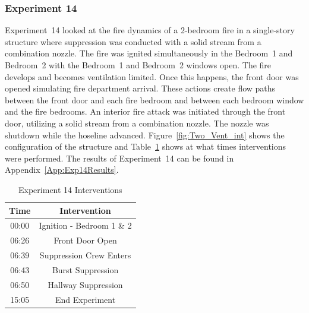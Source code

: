 \documentclass[12pt,oneside]{book}
\begin{document}
\subsubsection{Experiment 14}
Experiment~14 looked at the fire dynamics of a 2-bedroom fire in a single-story structure where suppression was conducted with a solid stream from a combination nozzle. The fire was ignited simultaneously in the Bedroom~1 and Bedroom~2 with the Bedroom~1 and Bedroom~2 windows open. The fire develops and becomes ventilation limited. Once this happens, the front door was opened simulating fire department arrival. These actions create flow paths between the front door and each fire bedroom and between each bedroom window and the fire bedrooms. An interior fire attack was initiated through the front door, utilizing a solid stream from a combination nozzle. The nozzle was shutdown while the hoseline advanced. Figure~\ref{fig:Two_Vent_int} shows the configuration of the structure and Table~\ref{Table:Exp14Interventions} shows at what times interventions were performed. The results of Experiment~14 can be found in Appendix~\ref{App:Exp14Results}. 


\begin{table}[H]
	\centering
	\caption{Experiment 14 Interventions}
	\begin{tabular}{|c|c|} 
		\hline
		Time & Intervention \\ \hline \hline
		00:00 & Ignition - Bedroom 1 \& 2 \\ \hline
		06:26 & Front Door Open \\ \hline
		06:39 & Suppression Crew Enters\\ \hline
		06:43 & Burst Suppression \\ \hline 
		06:50 & Hallway Suppression \\ \hline
		15:05 & End Experiment\\ \hline
	\end{tabular}
	\label{Table:Exp14Interventions}
\end{table}

\FloatBarrier
\end{document}
